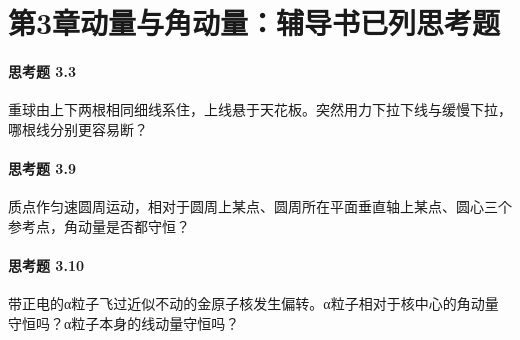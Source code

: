 \section*{第3章\quad 动量与角动量：辅导书已列思考题}
\paragraph{思考题 3.3}
重球由上下两根相同细线系住，上线悬于天花板。突然用力下拉下线与缓慢下拉，哪根线分别更容易断？

\paragraph{思考题 3.9}
质点作匀速圆周运动，相对于圆周上某点、圆周所在平面垂直轴上某点、圆心三个参考点，角动量是否都守恒？

\paragraph{思考题 3.10}
带正电的α粒子飞过近似不动的金原子核发生偏转。α粒子相对于核中心的角动量守恒吗？α粒子本身的线动量守恒吗？
